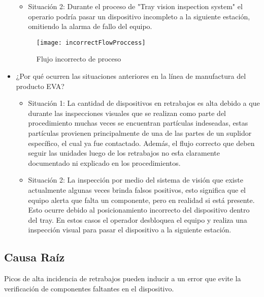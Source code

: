 \begin{itemize}
\begin{itemize}
            \item Situaci\'on 2: Durante el proceso de "Tray vision inspection system" el operario podr\'ia pasar un dispositivo incompleto a la siguiente estaci\'on, omitiendo la alarma de fallo del equipo.
        
        \end{itemize}
        
    \begin{figure}[ht]
    \centering
    \texttt{[image: incorrectFlowProccess]}
    \caption{Flujo incorrecto de proceso}
    \label{fig:incorrectFlow}
    \end{figure}
    
    \item ¿Por qu\'e ocurren las situaciones anteriores en la l\'inea de manufactura del producto
    EVA?
    
    \begin{itemize}
    
        \item Situaci\'on 1: La cantidad de dispositivos en retrabajos es alta debido a que
        durante las inspecciones visuales que se realizan como parte del procedimiento
        muchas veces se encuentran part\'iculas indeseadas, estas part\'iculas provienen
        principalmente de una de las partes de un suplidor espec\'ifico, el cual ya fue
        contactado. Adem\'as, el flujo correcto que deben seguir las unidades luego de los
        retrabajos no es\'ta claramente documentado ni explicado en los procedimientos.
        
        \item Situaci\'on 2: La inspecci\'on por medio del sistema de visi\'on que existe actualmente algunas veces brinda falsos positivos, esto significa que el equipo alerta que falta un componente, pero en realidad si est\'a presente. Esto ocurre debido al posicionamiento incorrecto del dispositivo dentro del tray. En estos casos
        el operador desbloquea el equipo y realiza una inspecci\'on visual para pasar el
        dispositivo a la siguiente estaci\'on.
    
    \end{itemize}

\end{itemize}


\subsection{Causa Ra\'iz}
Picos de alta incidencia de retrabajos pueden inducir a un error que evite la verificaci\'on de componentes faltantes en el dispositivo.

